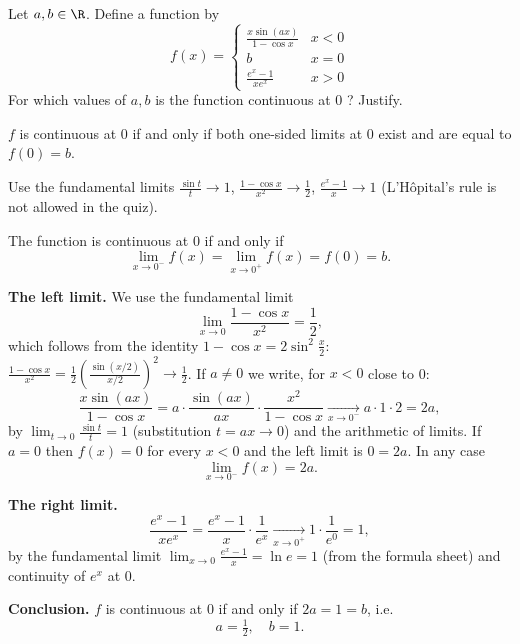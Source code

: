 
\begin{question}
Let $a,b\in\R$. Define a function by
\[
f(x)=\begin{cases}
\frac{x\sin(ax)}{1-\cos x} & x<0\\
b & x=0\\
\frac{e^x-1}{xe^x} & x>0
\end{cases}
\]
For which values of $a,b$ is the function continuous at $0$ ? Justify.
\end{question}

\begin{hint}
$f$ is continuous at 0 if and only if both one-sided limits at 0 exist and are equal to $f(0)=b$.
\end{hint}

\begin{hint}
Use the fundamental limits $\frac{\sin t}{t}\to1$, $\frac{1-\cos x}{x^2}\to\frac12$, $\frac{e^x-1}{x}\to1$ (L'Hôpital's rule is not allowed in the quiz).
\end{hint}

\begin{solution}
The function is continuous at 0 if and only if
\[
\lim_{x\to0^-}f(x)=\lim_{x\to0^+}f(x)=f(0)=b .
\]

\textbf{The left limit.} We use the fundamental limit
\[
\lim_{x\to0}\frac{1-\cos x}{x^2}=\frac12 ,
\]
which follows from the identity $1-\cos x=2\sin^2\frac x2$: $\frac{1-\cos x}{x^2}=\frac12\left(\frac{\sin(x/2)}{x/2}\right)^2\to\frac12$.
If $a\neq0$ we write, for $x<0$ close to 0:
\[
\frac{x\sin(ax)}{1-\cos x}=a\cdot\frac{\sin(ax)}{ax}\cdot\frac{x^2}{1-\cos x}\xrightarrow[x\to0^-]{}a\cdot1\cdot2=2a ,
\]
by $\lim_{t\to0}\frac{\sin t}{t}=1$ (substitution $t=ax\to0$) and the arithmetic of limits.
If $a=0$ then $f(x)=0$ for every $x<0$ and the left limit is $0=2a$. In any case
\[
\lim_{x\to0^-}f(x)=2a .
\]

\textbf{The right limit.}
\[
\frac{e^x-1}{xe^x}=\frac{e^x-1}{x}\cdot\frac{1}{e^x}\xrightarrow[x\to0^+]{}1\cdot\frac{1}{e^0}=1 ,
\]
by the fundamental limit $\lim_{x\to0}\frac{e^x-1}{x}=\ln e=1$ (from the formula sheet) and continuity of $e^x$ at 0.

\textbf{Conclusion.} $f$ is continuous at 0 if and only if $2a=1=b$, i.e.
\[
\boxed{a=\tfrac12,\quad b=1.}
\]
\end{solution}

